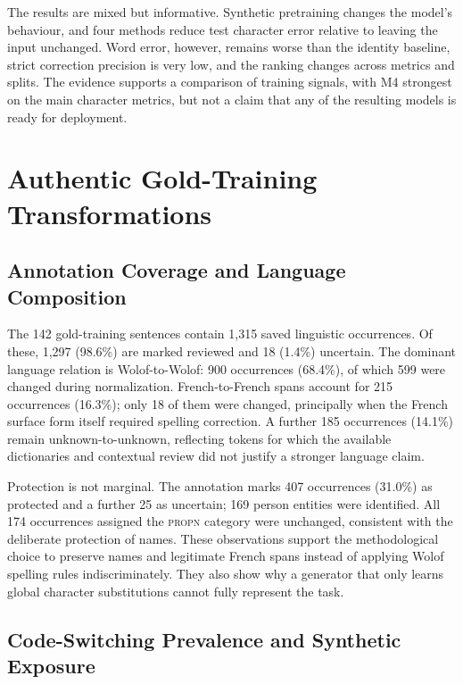 \documentclass[12pt, a4paper, twoside, openany]{report}
\begin{document}
The results are mixed but informative. Synthetic pretraining changes the model's behaviour, and four methods reduce test character error relative to leaving the input unchanged. Word error, however, remains worse than the identity baseline, strict correction precision is very low, and the ranking changes across metrics and splits. The evidence supports a comparison of training signals, with M4 strongest on the main character metrics, but not a claim that any of the resulting models is ready for deployment.


\section{Authentic Gold-Training Transformations}

\subsection{Annotation Coverage and Language Composition}

The 142 gold-training sentences contain 1,315 saved linguistic occurrences. Of these, 1,297 (98.6\%) are marked reviewed and 18 (1.4\%) uncertain. The dominant language relation is Wolof-to-Wolof: 900 occurrences (68.4\%), of which 599 were changed during normalization. French-to-French spans account for 215 occurrences (16.3\%); only 18 of them were changed, principally when the French surface form itself required spelling correction. A further 185 occurrences (14.1\%) remain unknown-to-unknown, reflecting tokens for which the available dictionaries and contextual review did not justify a stronger language claim.

Protection is not marginal. The annotation marks 407 occurrences (31.0\%) as protected and a further 25 as uncertain; 169 person entities were identified. All 174 occurrences assigned the \textsc{propn} category were unchanged, consistent with the deliberate protection of names. These observations support the methodological choice to preserve names and legitimate French spans instead of applying Wolof spelling rules indiscriminately. They also show why a generator that only learns global character substitutions cannot fully represent the task.

\subsection{Code-Switching Prevalence and Synthetic Exposure}
\end{document}
